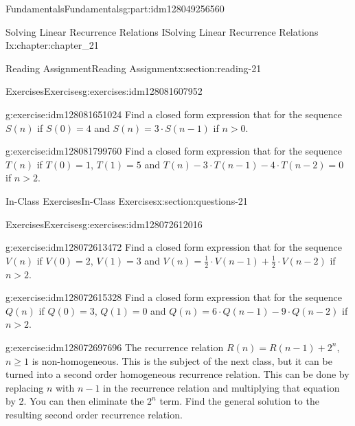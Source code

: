 \documentclass[oneside,10pt,]{book}
\numberwithin{equation}{section}
\newcommand{\gt}{>}
\begin{document}
\begin{partptx}{Fundamentals}{}{Fundamentals}{}{}{g:part:idm128049256560}
\begin{chapterptx}{Solving Linear Recurrence Relations I}{}{Solving Linear Recurrence Relations I}{}{}{x:chapter:chapter_21}
\begin{sectionptx}{Reading Assignment}{}{Reading Assignment}{}{}{x:section:reading-21}
\begin{exercises-subsection}{Exercises}{}{Exercises}{}{}{g:exercises:idm128081607952}
\begin{exercisegroup}
\begin{divisionexerciseeg}{1}{}{}{g:exercise:idm128081651024}%
Find a closed form expression that for the sequence \(S(n)\) if  \(S(0)=4\) and \(S(n)=3 \cdot S(n-1)\) if \(n \gt 0\).%
\end{divisionexerciseeg}%
\begin{divisionexerciseeg}{2}{}{}{g:exercise:idm128081799760}%
Find a closed form expression that for the sequence \(T(n)\) if  \(T(0)=1\), \(T(1)= 5\) and \(T(n)- 3\cdot T(n-1) -4 \cdot T(n-2)=0\) if \(n \gt 2\).%
\end{divisionexerciseeg}%
\end{exercisegroup}
\par\medskip\noindent
\end{exercises-subsection}
\end{sectionptx}
%
%
\typeout{************************************************}
\typeout{************************************************}
%
\begin{sectionptx}{In-Class Exercises}{}{In-Class Exercises}{}{}{x:section:questions-21}
%
%
%
\typeout{************************************************}
\typeout{************************************************}
%
\begin{exercises-subsection}{Exercises}{}{Exercises}{}{}{g:exercises:idm128072612016}
\par\medskip\noindent%
%
\begin{exercisegroup}
\begin{divisionexerciseeg}{1}{}{}{g:exercise:idm128072613472}%
Find a closed form expression that for the sequence \(V(n)\) if  \(V(0)=2\), \(V(1)= 3\) and \(V(n)= \frac{1}{2}\cdot V(n-1)+ \frac{1}{2}\cdot V(n-2)\) if \(n \gt 2\).%
\end{divisionexerciseeg}%
\begin{divisionexerciseeg}{2}{}{}{g:exercise:idm128072615328}%
Find a closed form expression that for the sequence \(Q(n)\) if  \(Q(0)=3\), \(Q(1)= 0\) and \(Q(n)=6\cdot Q(n-1)-9\cdot Q(n-2)\) if \(n \gt 2\).%
\end{divisionexerciseeg}%
\begin{divisionexerciseeg}{3}{}{}{g:exercise:idm128072697696}%
The recurrence relation \(R(n)=R(n-1)+2^n\), \(n \geq 1\) is non-homogeneous.  This is the subject of the next class, but it can be turned into a second order homogeneous recurrence relation.  This can be done by replacing \(n\) with \(n-1\) in the recurrence relation and multiplying that equation by 2.   You can then eliminate the \(2^n\) term. Find the general solution to the resulting second order recurrence relation.%

\end{divisionexerciseeg}
\end{exercisegroup}
\end{exercises-subsection}
\end{sectionptx}
\end{chapterptx}
\end{partptx}
\end{document}
